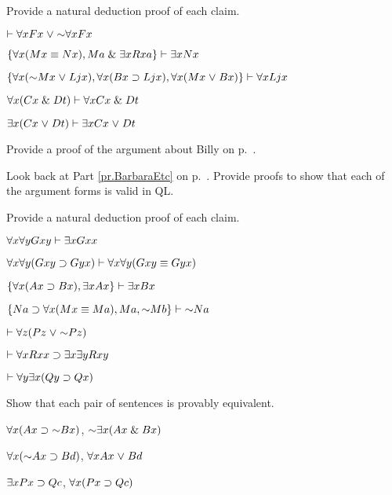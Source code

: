 \solutions
\problempart
\label{pr.someQLproofs}
Provide a natural deduction proof of each claim.
\begin{earg}
\item $\vdash \qt{\forall}{x} Fx \eor \enot \qt{\forall}{x} Fx$
\item $\{\forall x(Mx \equiv Nx), Ma\mathrel\&\exists x Rxa\}\vdash \exists x Nx$
\item $\{\qt{\forall}{x}(\enot Mx \eor Ljx), \qt{\forall}{x}(Bx\eif Ljx), \qt{\forall}{x}(Mx\eor Bx)\}\vdash \qt{\forall}{x}Ljx$
\item $\forall x(Cx \mathrel\& Dt)\vdash \forall xCx \mathrel\& Dt$
\item $\exists x(Cx \mkern1mu\vee\mkern1mu Dt)\vdash \exists x Cx \mkern1mu\vee\mkern1mu Dt$
\end{earg}

\problempart
Provide a proof of the argument about Billy on p.~\pageref{surgeon2}.



\problempart
\label{pr.BarbaraEtc.proof1}
Look back at Part \ref{pr.BarbaraEtc} on p.~\pageref{pr.BarbaraEtc}. Provide proofs to show that each of the argument forms is valid in QL.




\solutions
\problempart
\label{pr.QLproofsNDe}
Provide a natural deduction proof of each claim.
\begin{earg}
\item $\forall x \forall y Gxy\vdash\exists x Gxx$
\item $\forall x \forall y (Gxy \supset Gyx) \vdash \forall x\forall y (Gxy \equiv Gyx)$
\item $\{\forall x(Ax\supset Bx), \exists x Ax\} \vdash \exists x Bx$
\item $\{Na \eif \qt{\forall}{x}(Mx \eiff Ma), Ma, \enot Mb\}\vdash \enot Na$
\item $\vdash\qt{\forall}{z} (Pz \eor \enot Pz)$
\item $\vdash\forall x Rxx\supset \exists x \exists y Rxy$
\item $\vdash\forall y \exists x (Qy \supset Qx)$
\end{earg}



\problempart
Show that each pair of sentences is provably equivalent.
\begin{earg}
\item $\qt{\forall}{x} (Ax\eif \enot Bx)$, $\enot\qt{\exists}{x}(Ax \eand Bx)$
\item $\qt{\forall}{x} (\enot Ax\eif Bd)$, $\forall x Ax \mkern1mu\vee\mkern1mu Bd$
\item $\exists x Px \supset Qc$, $\forall x (Px \supset Qc)$
\end{earg}



